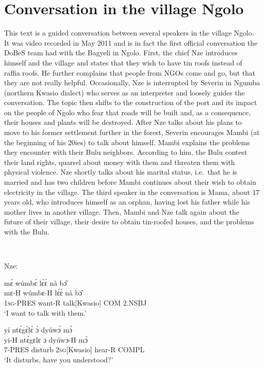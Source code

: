 \pagebreak

\section{Conversation in the village Ngolo}
\label{sec:Conversation}

This text is a guided conversation between several speakers in the village Ngolo. It was video recorded in May 2011 and is in fact the first official conversation the DoBeS team had with the Bagyeli in Ngolo.  First, the chief Nze introduces himself and the village and states that they wish to have tin roofs instead of raffia roofs. He further complains that people from NGOs come and go, but that they are not really helpful. Occasionally, Nze is interrupted by Severin in Ngumba (northern Kwasio dialect) who serves as an interpreter and loosely guides the conversation. The topic then shifts to the construction of the port and its impact on the people of Ngolo who fear that roads will be built and, as a consequence, their houses and plants will be destroyed. After Nze talks about his plans to move to his former settlement further in the forest, Severin encourages Mambi (at the beginning of his 20ies) to talk about himself. Mambi explains the problems they encounter with their Bulu neighbors. According to him, the Bulu contest their land rights, quarrel about money with them and threaten them with physical violence.
Nze shortly talks about his marital status, i.e.\ that he is married and has two children before Mambi continues about their wish to obtain electricity in the village. The third speaker in the conversation is Mama, about 17 years old, who introduces himself as an orphan, having lost his father while his mother lives in another village. Then, Mambi and Nze talk again about the future of their village, their desire to obtain tin-roofed houses, and the problems with the Bulu.

\

Nze:

\begin{exe} 
\exC\label{01}
  \glll     mɛ́ wúmbɛ́ lɛ́ɛ̀ nà bɔ̂\\
           mɛ-H wúmbɛ-H lɛ́ɛ̀ nà bɔ̂ \\
              1\textsc{sg}-PRES want-R talk[Kwasio] COM 2.NSBJ   \\
    \trans `I want to talk with them.'
\end{exe}

\begin{exe} 
\exC\label{02}
  \glll     yí ntɛ́gɛ̀lɛ̀ ɔ̀ dyúwɔ́ mɔ̀ \\
            yi-H ntɛ́gɛlɛ ɔ dyúwɔ-H mɔ̀ \\
             7-PRES disturb  2\textsc{sg}[Kwasio] hear-R COMPL  \\
    \trans `It disturbs, have you understood?'
\end{exe}

